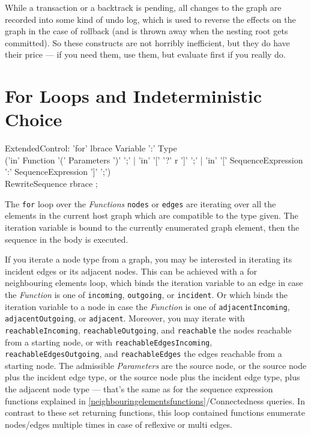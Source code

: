 \begin{note}
While a transaction or a backtrack is pending, all changes to the graph are recorded into some kind of undo log, which is used to reverse the effects on the graph in the case of rollback (and is thrown away when the nesting root gets committed).
So these constructs are not horribly inefficient, but they do have their price --- if you need them, use them, but evaluate first if you really do.
\end{note}


\section{For Loops and Indeterministic Choice}

\begin{rail}
  ExtendedControl:
    'for' lbrace Variable ':' Type\\
    ('in' Function '(' Parameters ')' ';' |
    'in' '[' '?' r ']' ';' |
		'in' '[' SequenceExpression ':' SequenceExpression ']' ';')\\
    RewriteSequence rbrace
    ;
\end{rail}\label{forgraphelem}\label{forincidentadjacent}\label{formatch}

The \texttt{for} loop over the \emph{Functions} \texttt{nodes} or \texttt{edges} are iterating over all the elements in the current host graph which are compatible to the type given.
The iteration variable is bound to the currently enumerated graph element, then the sequence in the body is executed.

If you iterate a node type from a graph, you may be interested in iterating its incident edges or its adjacent nodes.
This can be achieved with a for neighbouring elements loop, which binds the iteration variable to an edge in case the \emph{Function} is one of \texttt{incoming}, \texttt{outgoing}, or \texttt{incident}. 
Or which binds the iteration variable to a node in case the \emph{Function} is one of \texttt{adjacentIncoming}, \texttt{adjacentOutgoing}, or \texttt{adjacent}.
Moreover, you may iterate with \texttt{reachableIncoming}, \texttt{reachableOutgoing}, and \texttt{reachable} the nodes reachable from a starting node, or with \texttt{reachableEdgesIncoming}, \texttt{reachableEdgesOutgoing}, and \texttt{reachableEdges} the edges reachable from a starting node.
The admissible \emph{Parameters} are the source node, or the source node plus the incident edge type, or the source node plus the incident edge type, plus the adjacent node type ---
that's the same as for the sequence expression functions explained in \ref{neighbouringelementsfunctions}/Connectedness queries.
In contrast to these set returning functions, this loop contained functions enumerate nodes/edges multiple times in case of reflexive or multi edges.

